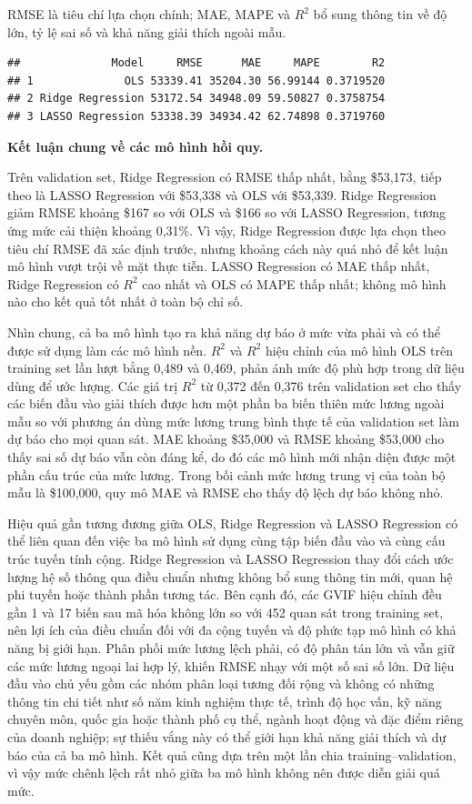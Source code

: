 RMSE là tiêu chí lựa chọn chính; MAE, MAPE và \(R^2\) bổ sung thông tin về độ
lớn, tỷ lệ sai số và khả năng giải thích ngoài mẫu.

\begin{verbatim}
##              Model     RMSE      MAE     MAPE        R2
## 1              OLS 53339.41 35204.30 56.99144 0.3719520
## 2 Ridge Regression 53172.54 34948.09 59.50827 0.3758754
## 3 LASSO Regression 53338.39 34934.42 62.74898 0.3719760
\end{verbatim}

\textbf{Kết luận chung về các mô hình hồi quy.}

Trên validation set, Ridge Regression có RMSE thấp nhất, bằng \$53,173,
tiếp theo là LASSO Regression với \$53,338 và OLS với \$53,339. Ridge
Regression giảm RMSE khoảng \$167 so với OLS và \$166 so với LASSO
Regression, tương ứng mức cải thiện khoảng 0,31\%. Vì vậy, Ridge
Regression được lựa chọn theo tiêu chí RMSE đã xác định trước, nhưng
khoảng cách này quá nhỏ để kết luận mô hình vượt trội về mặt thực tiễn.
LASSO Regression có MAE thấp nhất, Ridge Regression có \(R^2\) cao nhất và
OLS có MAPE thấp nhất; không mô hình nào cho kết quả tốt nhất ở toàn bộ
chỉ số.

Nhìn chung, cả ba mô hình tạo ra khả năng dự báo ở mức vừa phải và có
thể được sử dụng làm các mô hình nền. \(R^2\) và \(R^2\) hiệu chỉnh của mô hình
OLS trên training set lần lượt bằng 0,489 và 0,469, phản ánh mức độ phù
hợp trong dữ liệu dùng để ước lượng. Các giá trị \(R^2\) từ 0,372 đến 0,376
trên validation set cho thấy các biến đầu vào giải thích được hơn một
phần ba biến thiên mức lương ngoài mẫu so với phương án dùng mức lương
trung bình thực tế của validation set làm dự báo cho mọi quan sát. MAE
khoảng \$35,000 và RMSE khoảng \$53,000 cho thấy sai số dự báo vẫn còn
đáng kể, do đó các mô hình mới nhận diện được một phần cấu trúc của mức
lương. Trong bối cảnh mức lương trung vị của toàn bộ mẫu là \$100,000,
quy mô MAE và RMSE cho thấy độ lệch dự báo không nhỏ.

Hiệu quả gần tương đương giữa OLS, Ridge Regression và LASSO Regression
có thể liên quan đến việc ba mô hình sử dụng cùng tập biến đầu vào và
cùng cấu trúc tuyến tính cộng. Ridge Regression và LASSO Regression thay
đổi cách ước lượng hệ số thông qua điều chuẩn nhưng không bổ sung thông
tin mới, quan hệ phi tuyến hoặc thành phần tương tác. Bên cạnh đó, các
GVIF hiệu chỉnh đều gần 1 và 17 biến sau mã hóa không lớn so với 452
quan sát trong training set, nên lợi ích của điều chuẩn đối với đa cộng
tuyến và độ phức tạp mô hình có khả năng bị giới hạn. Phân phối mức
lương lệch phải, có độ phân tán lớn và vẫn giữ các mức lương ngoại lai
hợp lý, khiến RMSE nhạy với một số sai số lớn. Dữ liệu đầu vào chủ yếu
gồm các nhóm phân loại tương đối rộng và không có những thông tin chi
tiết như số năm kinh nghiệm thực tế, trình độ học vấn, kỹ năng chuyên
môn, quốc gia hoặc thành phố cụ thể, ngành hoạt động và đặc điểm riêng
của doanh nghiệp; sự thiếu vắng này có thể giới hạn khả năng giải thích
và dự báo của cả ba mô hình. Kết quả cũng dựa trên một lần chia
training--validation, vì vậy mức chênh lệch rất nhỏ giữa ba mô hình
không nên được diễn giải quá mức.

